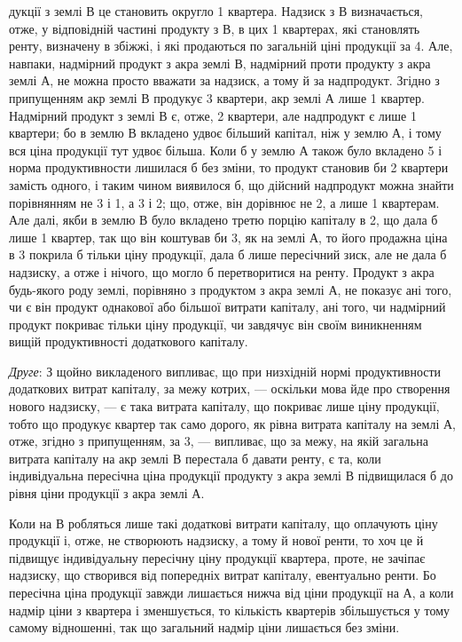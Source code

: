 \parcont{}  %
дукції з землі $В$ це становить округло 1 квартера. Надзиск з $В$ визначається,
отже, у відповідній частині продукту з $В$, в цих 1 квартерах, які
становлять ренту, визначену в збіжжі, і які продаються по загальній ціні продукції
за 4. Але, навпаки, надмірний продукт з акра землі $В$, надмірний
проти продукту з акра землі $А$, не можна просто вважати за надзиск,
а тому й за надпродукт. Згідно з припущенням акр землі $В$ продукує 3 квартери,
акр землі $А$ лише 1 квартер. Надмірний продукт з землі $В$ є, отже,
2 квартери, але надпродукт є лише 1 квартери; бо в землю
$В$ вкладено удвоє більший капітал, ніж у землю $А$, і тому вся ціна продукції тут удвоє
більша. Коли б у землю $А$ також було вкладено 5 і норма продуктивности
лишилася б без зміни, то продукт становив би 2 квартери замість одного,
і таким чином виявилося б, що дійсний надпродукт можна знайти порівнянням
не 3 і 1, а 3 і 2; що, отже, він дорівнює не 2,
а лише 1 квартерам.
Але далі, якби в землю $В$ було вкладено третю порцію капіталу в 2,
що дала б лише 1 квартер, так що він коштував би 3, як на землі $А$, то
його продажна ціна в 3 покрила б тільки ціну продукції, дала б лише
пересічний зиск, але не дала б надзиску, а отже і нічого, що могло б перетворитися
на ренту. Продукт з акра будь-якого роду землі, порівняно з продуктом
з акра землі $А$, не показує ані того, чи є він продукт однакової або більшої
витрати капіталу, ані того, чи надмірний продукт покриває тільки ціну продукції,
чи завдячує він своїм виникненням вищій продуктивності додаткового капіталу.

\emph{Друге}: З щойно викладеного випливає, що при низхідній нормі продуктивности
додаткових витрат капіталу, за межу котрих, — оскільки мова йде
про створення нового надзиску, — є така витрата капіталу, що покриває лише
ціну продукції, тобто що продукує квартер так само дорого, як рівна витрата
капіталу на землі $А$, отже, згідно з припущенням, за 3, — випливає,
що за межу, на якій загальна витрата капіталу на акр землі $В$ перестала б
давати ренту, є та, коли індивідуальна пересічна ціна продукції продукту з
акра землі $В$ підвищилася б до рівня ціни продукції з акра землі $А$.

Коли на $В$ робляться лише такі додаткові витрати капіталу, що оплачують
ціну продукції і, отже, не створюють надзиску, а тому й нової ренти, то хоч
це й підвищує індивідуальну пересічну ціну продукції квартера, проте, не зачіпає
надзиску, що створився від попередніх витрат капіталу, евентуально ренти. Бо
пересічна ціна продукції завжди лишається нижча від ціни продукції на $А$, а коли
надмір ціни з квартера і зменшується, то кількість квартерів збільшується
у тому самому відношенні, так що загальний надмір ціни лишається без зміни.

